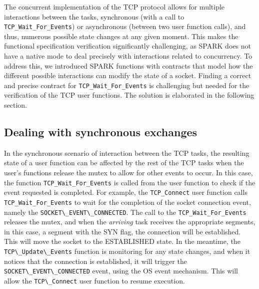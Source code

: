 \documentclass[conference]{IEEEtran}
\def\spark#1{\lstinline[language=Ada]{#1}}
\def\state#1{\textsf{\MakeUppercase{#1}}\xspace}
\def\sestab{\state{established}}
\def\flag#1{\textsf{#1}\xspace}
\def\syn{\flag{SYN}}
\begin{document}


%


The concurrent implementation of the TCP protocol allows for multiple interactions between the tasks, synchronous (with a call to \spark{TCP_Wait_For_Events}) or asynchronous (between two user function calls), and thus, numerous possible state changes at any given moment. This makes the functional specification verification significantly challenging, as SPARK does not have a native mode to deal precisely with interactions related to concurrency. To address this, we introduced SPARK functions with contracts that model how the different possible interactions can modify the state of a socket. Finding a correct and precise contract for \spark{TCP_Wait_For_Events} is challenging but needed for the verification of the TCP user functions. The solution is elaborated in the following section.


\subsection{Dealing with synchronous exchanges}


In the synchronous scenario of interaction between the TCP tasks, the resulting state of a user function can be affected by the rest of the TCP tasks when the user's functions release the mutex to allow for other events to occur. In this case, the function \spark{TCP_Wait_For_Events} is called from the user function to check if the event requested is completed. For example, the \spark{TCP_Connect} user function calls \spark{TCP_Wait_For_Events} to wait for the completion of the socket connection event, namely the \spark{SOCKET\_EVENT\_CONNECTED}. The call to the \spark{TCP_Wait_For_Events} releases the mutex, and when the \emph{arriving} task receives the appropriate segments, in this case, a segment with the \syn flag, the connection will be established. This will move the socket to the \sestab state. In the meantime, the \spark{TCP\_Update\_Events} function is monitoring for any state changes, and when it notices that the connection is established, it will trigger the \spark{SOCKET\_EVENT\_CONNECTED} event, using the OS event mechanism. This will allow the \spark{TCP\_Connect} user function to resume execution.
\end{document}
